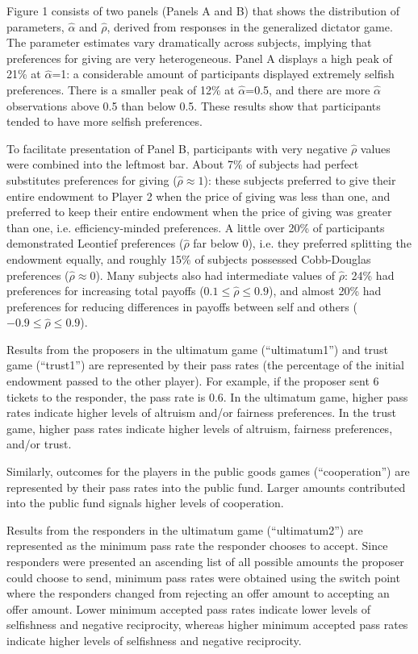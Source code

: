 \documentclass[12pt]{article}
\begin{document}
Figure 1 consists of two panels (Panels A and B) that shows the distribution of parameters, \(\hat{\alpha}\) and \(\hat{\rho}\), derived from responses in the generalized dictator game.  The parameter estimates vary dramatically across subjects, implying that preferences for giving are very heterogeneous. Panel A displays a high peak of 21\% at \(\hat{\alpha}\)=1: a considerable amount of participants displayed extremely selfish preferences. There is a smaller peak of 12\% at \(\hat{\alpha}\)=0.5, and there are more \(\hat{\alpha}\) observations above 0.5 than below 0.5. These results show that participants tended to have more selfish preferences. 

To facilitate presentation of Panel B, participants with very negative \(\hat{\rho}\) values were combined into the leftmost bar. About 7\% of subjects had perfect substitutes preferences for giving (\(\hat{\rho} \approx 1\)): these subjects preferred to give their entire endowment to Player 2 when the price of giving was less than one, and preferred to keep their entire endowment when the price of giving was greater than one, i.e. efficiency-minded preferences. A little over 20\% of participants demonstrated Leontief preferences (\(\hat{\rho}\) far below 0), i.e. they preferred splitting the endowment equally, and roughly 15\% of subjects possessed Cobb-Douglas preferences (\(\hat{\rho} \approx 0\)). Many subjects also had intermediate values of \(\hat{\rho}\): 24\% had preferences for increasing total payoffs (\(0.1 \leq \hat{\rho} \leq 0.9\)), and almost 20\% had preferences for reducing differences in payoffs between self and others (\(-0.9 \leq \hat{\rho} \leq 0.9\)).

Results from the proposers in the ultimatum game (``ultimatum1'') and trust game (``trust1'') are represented by their pass rates (the percentage of the initial endowment passed to the other player). For example, if the proposer sent 6 tickets to the responder, the pass rate is 0.6. In the ultimatum game, higher pass rates indicate higher levels of altruism and/or fairness preferences. In the trust game, higher pass rates indicate higher levels of altruism, fairness preferences, and/or trust. 

Similarly, outcomes for the players in the public goods games (``cooperation'') are represented by their pass rates into the public fund. Larger amounts contributed into the public fund signals higher levels of cooperation.

Results from the responders in the ultimatum game (``ultimatum2'') are represented as the minimum pass rate the responder chooses to accept. Since responders were presented an ascending list of all possible amounts the proposer could choose to send, minimum pass rates were obtained using the switch point where the responders changed from rejecting an offer amount to accepting an offer amount. Lower minimum accepted pass rates indicate lower levels of selfishness and negative reciprocity, whereas higher minimum accepted pass rates indicate higher levels of selfishness and negative reciprocity.
\end{document}
